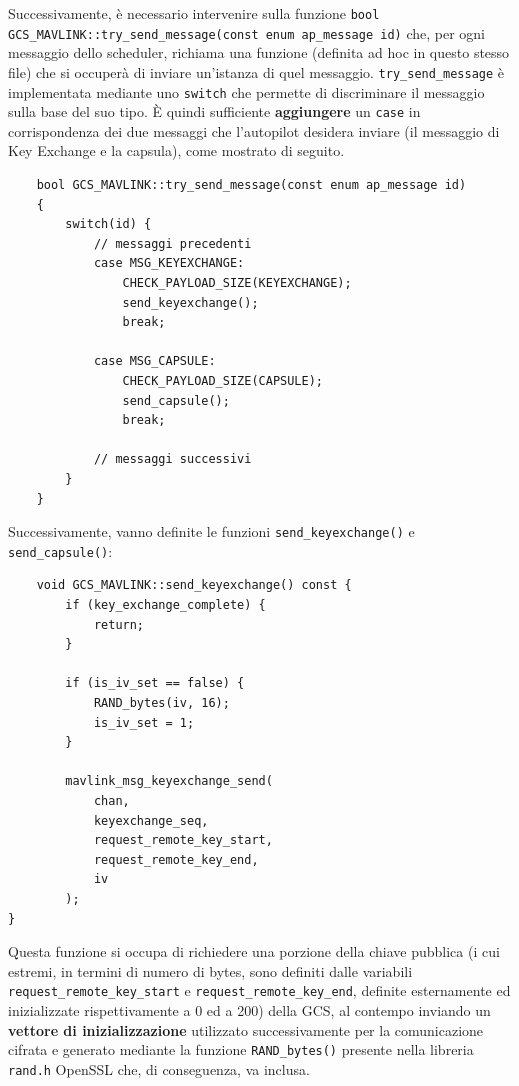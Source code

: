 \documentclass[a4paper, 12pt, oneside]{article}
\theoremstyle{definition}
\begin{document}
Successivamente, è necessario intervenire sulla funzione \texttt{bool GCS\_MAVLINK::try\_send\_message(const enum ap\_message id)} che, per ogni messaggio dello scheduler, richiama una funzione (definita ad hoc in questo stesso file) che si occuperà di inviare un'istanza di quel messaggio. \texttt{try\_send\_message} è implementata mediante uno \texttt{switch} che permette di discriminare il messaggio sulla base del suo tipo. È quindi sufficiente \textbf{aggiungere} un \texttt{case} in corrispondenza dei due messaggi che l'autopilot desidera inviare (il messaggio di Key Exchange e la capsula), come mostrato di seguito.

\begin{verbatim}
    bool GCS_MAVLINK::try_send_message(const enum ap_message id)
    {
        switch(id) {
            // messaggi precedenti
            case MSG_KEYEXCHANGE:
                CHECK_PAYLOAD_SIZE(KEYEXCHANGE);
                send_keyexchange();
                break;

            case MSG_CAPSULE:
                CHECK_PAYLOAD_SIZE(CAPSULE);
                send_capsule();
                break;
            
            // messaggi successivi
        }
    }
\end{verbatim}



Successivamente, vanno definite le funzioni \texttt{send\_keyexchange()} e \texttt{send\_capsule()}:

\begin{verbatim}
    void GCS_MAVLINK::send_keyexchange() const {
        if (key_exchange_complete) {
            return;
        }

        if (is_iv_set == false) {
            RAND_bytes(iv, 16);
            is_iv_set = 1;
        }

        mavlink_msg_keyexchange_send(
            chan,
            keyexchange_seq,
            request_remote_key_start,
            request_remote_key_end,
            iv
        );    
}
\end{verbatim}

Questa funzione si occupa di richiedere una porzione della chiave pubblica (i cui estremi, in termini di numero di bytes, sono definiti dalle variabili \texttt{request\_remote\_key\_start} e \texttt{request\_remote\_key\_end}, definite esternamente ed inizializzate rispettivamente a 0 ed a 200) della GCS, al contempo inviando un \textbf{vettore di inizializzazione} utilizzato successivamente per la comunicazione cifrata e generato mediante la funzione \texttt{RAND\_bytes()} presente nella libreria \texttt{rand.h} OpenSSL che, di conseguenza, va inclusa.
\end{document}
